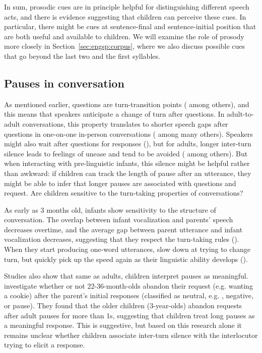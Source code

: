 In sum, prosodic cues are in principle helpful for distinguishing different speech acts, and there is evidence suggesting that children can perceive these cues. In particular, there might be cues at sentence-final and sentence-initial position that are both useful and available to children. We will examine the role of prosody more closely in Section~\ref{sec:engsp:corpus}, where we also discuss possible cues that go beyond the last two and the first syllables.

\subsection{Pauses in conversation}
\label{sec:engsp:bg:pause}
As mentioned earlier, questions are turn-transition points (\cite{duncan1972turn} among others), and this means that speakers anticipate a change of turn after questions. In adult-to-adult conversations, this property translates to shorter speech gaps after questions in one-on-one in-person conversations (\cite{stivers2010,enfield2010,hilbrink2013turn} among many others). Speakers might also wait after questions for responses (\cite{sacks1978pause}), but for adults, longer inter-turn silence leads to feelings of unease and tend to be avoided (\cite{roberts2006pause} among others). But when interacting with pre-linguistic infants, this silence might be helpful rather than awkward: if children can track the length of pause after an utterance, they might be able to infer that longer pauses are associated with questions and request. Are children sensitive to the turn-taking properties of conversations? 

As early as 3 months old, infants show sensitivity to the structure of conversation. The overlap between infant vocalization and parents' speech decreases overtime, and the average gap between parent utterance and infant vocalization decreases, suggesting that they respect the turn-taking rules (\cite{hilbrink2013turn3mo}). When they start producing one-word utterances, slow down at trying to change turn, but quickly pick up the speed again as their linguistic ability develops (\cite{hilbrink2013turn}).

Studies also show that same as adults, children interpret pauses as meaningful. \textcite{craiggallagher1983pause} 
investigate whether or not 22-36-month-olds abandon their request (e.g. wanting a cookie) after the parent's initial responses (classified as neutral, e.g. ,  negative,  or pause). They found that the older children (3-year-olds) abandon requests after adult pauses for more than 1s, suggesting that children treat long pauses as a meaningful response. This is suggestive, but based on this research alone it remains unclear whether children associate inter-turn silence with the interlocutor trying to elicit a response. 

